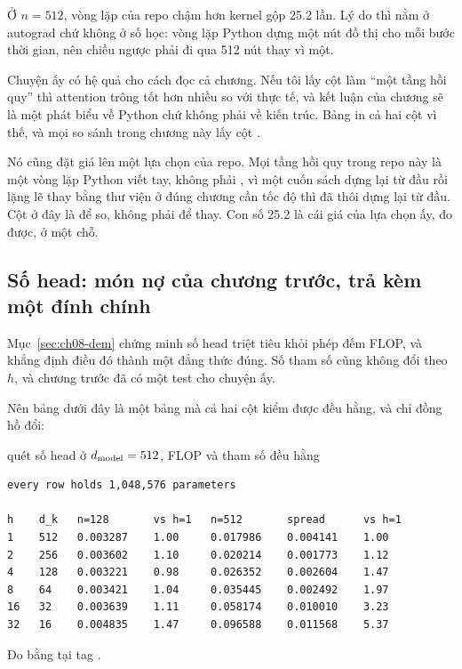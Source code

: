 Ở \(n = 512\), vòng lặp của repo chậm hơn kernel gộp 25.2 lần. Lý do thì nằm ở
autograd chứ không ở số học: vòng lặp Python dựng một nút đồ thị cho mỗi bước
thời gian, nên chiều ngược phải đi qua 512 nút thay vì một.

Chuyện ấy có hệ quả cho cách đọc cả chương. Nếu tôi lấy cột  làm
\enquote{một tầng hồi quy} thì attention trông tốt hơn nhiều so với thực tế, và
kết luận của chương sẽ là một phát biểu về Python chứ không phải về kiến trúc.
Bảng in cả hai cột vì thế, và mọi so sánh trong chương này lấy cột
.

Nó cũng đặt giá lên một lựa chọn của repo. Mọi tầng hồi quy trong repo này là
một vòng lặp Python viết tay, không phải , vì một cuốn sách
dựng lại từ đầu rồi lặng lẽ thay bằng thư viện ở đúng chương cần tốc độ thì đã
thôi dựng lại từ đầu. Cột  ở đây là để so, không phải để thay. Con
số 25.2 là cái giá của lựa chọn ấy, đo được, ở một chỗ.

\subsection*{Số head: món nợ của chương trước, trả kèm một đính chính}

%
Mục~\ref{sec:ch08-dem} chứng minh số head triệt tiêu khỏi phép đếm FLOP, và
 khẳng định điều đó thành một đẳng thức đúng. Số tham
số cũng không đổi theo \(h\), và chương trước đã có một test cho chuyện ấy.

Nên bảng dưới đây là một bảng mà cả hai cột kiểm được đều hằng, và chỉ đồng hồ
đổi:

\begin{measured}{quét số head ở \(d_{\mathrm{model}} = 512\), FLOP và tham số đều hằng}
\begin{verbatim}
every row holds 1,048,576 parameters

h    d_k   n=128       vs h=1   n=512       spread      vs h=1
1    512   0.003287    1.00     0.017986    0.004141    1.00
2    256   0.003602    1.10     0.020214    0.001773    1.12
4    128   0.003221    0.98     0.026352    0.002604    1.47
8    64    0.003421    1.04     0.035445    0.002492    1.97
16   32    0.003639    1.11     0.058174    0.010010    3.23
32   16    0.004835    1.47     0.096588    0.011568    5.37
\end{verbatim}

Đo bằng  tại tag .
\end{measured}

